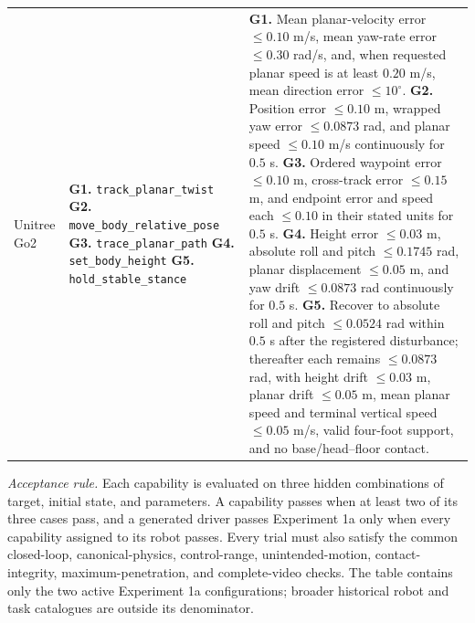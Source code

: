 \begin{longtable}{@{}>{\raggedright\arraybackslash}p{}
                        >{\raggedright\arraybackslash}p{}
                        >{\raggedright\arraybackslash}p{}@{}}
Unitree Go2
&
\textbf{G1.} \texttt{track\_planar\_twist}\newline
\textbf{G2.} \texttt{move\_body\_relative\_pose}\newline
\textbf{G3.} \texttt{trace\_planar\_path}\newline
\textbf{G4.} \texttt{set\_body\_height}\newline
\textbf{G5.} \texttt{hold\_stable\_stance}
&
\textbf{G1.} Mean planar-velocity error $\leq 0.10$ m/s, mean yaw-rate
error $\leq 0.30$ rad/s, and, when requested planar speed is at least
$0.20$ m/s, mean direction error $\leq 10^{\circ}$.\newline
\textbf{G2.} Position error $\leq 0.10$ m, wrapped yaw error
$\leq 0.0873$ rad, and planar speed $\leq 0.10$ m/s continuously for
$0.5$ s.\newline
\textbf{G3.} Ordered waypoint error $\leq 0.10$ m, cross-track error
$\leq 0.15$ m, and endpoint error and speed each $\leq 0.10$ in their
stated units for $0.5$ s.\newline
\textbf{G4.} Height error $\leq 0.03$ m, absolute roll and pitch
$\leq 0.1745$ rad, planar displacement $\leq 0.05$ m, and yaw drift
$\leq 0.0873$ rad continuously for $0.5$ s.\newline
\textbf{G5.} Recover to absolute roll and pitch $\leq 0.0524$ rad within
$0.5$ s after the registered disturbance; thereafter each remains
$\leq 0.0873$ rad, with height drift $\leq 0.03$ m, planar drift
$\leq 0.05$ m, mean planar speed and terminal vertical speed
$\leq 0.05$ m/s, valid four-foot support, and no base/head--floor contact.
\\

\end{longtable}

\noindent\footnotesize\textit{Acceptance rule.} Each capability is evaluated
on three hidden combinations of target, initial state, and parameters. A
capability passes when at least two of its three cases pass, and a generated
driver passes Experiment 1a only when every capability assigned to its robot
passes. Every trial must also satisfy the common closed-loop,
canonical-physics, control-range, unintended-motion, contact-integrity,
maximum-penetration, and complete-video checks. The table contains only the
two active Experiment 1a configurations; broader historical robot and task
catalogues are outside its denominator.

\endgroup
